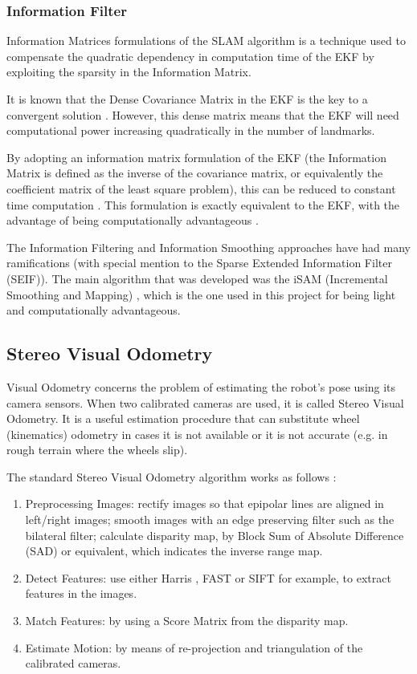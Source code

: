 \documentclass[12pt]{article}
\begin{document}
	\subsubsection{Information Filter}
Information Matrices formulations of the SLAM algorithm is a technique used to compensate the quadratic dependency in computation time of the EKF by exploiting the sparsity in the Information Matrix.

It is known that the Dense Covariance Matrix in the EKF is the key to a convergent solution \cite{SLAMPartI}. However, this dense matrix means that the EKF will need computational power increasing quadratically in the number of landmarks.
	
By adopting an information matrix formulation of the EKF (the Information Matrix is defined as the inverse of the covariance matrix, or equivalently the coefficient matrix of the least square problem), this can be reduced to constant time computation \cite{doi:10.1117/12.381658}. This formulation is exactly equivalent to the EKF, with the advantage of being computationally advantageous \cite{Dellaert-2006-9639}.
	
The Information Filtering and Information Smoothing approaches have had many ramifications (with special mention to the Sparse Extended Information Filter (SEIF)\cite{doi:10.1117/12.381658}). The main algorithm that was developed was the iSAM (Incremental Smoothing and Mapping) \cite{Kaess08tro}, which is the one used in this project for being light and computationally advantageous.	
	
	\subsection{Stereo Visual Odometry}

Visual Odometry concerns the problem of estimating the robot's pose using its camera sensors. When two calibrated cameras are used, it is called Stereo Visual Odometry. It is a useful estimation procedure that can substitute wheel (kinematics) odometry in cases it is not available or it is not accurate (e.g. in rough terrain where the wheels slip).
	
The standard Stereo Visual Odometry algorithm works as follows \cite{StereoVis1}:

\begin{enumerate}[leftmargin=.8in]
\item Preprocessing Images: rectify images so that epipolar lines are aligned in left/right images; smooth images with an edge preserving filter such as the bilateral filter; calculate disparity map, by Block Sum of Absolute Difference (SAD) or equivalent, which indicates the inverse range map.
\item Detect Features: use either Harris \cite{Harris}, FAST \cite{FAST} or  SIFT \cite{SIFT} for example, to extract features in the images.
\item Match Features: by using a Score Matrix from the disparity map.
\item Estimate Motion: by means of re-projection and triangulation of the calibrated cameras.
\end{enumerate}
	
\end{document}
